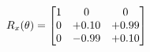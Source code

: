 \documentclass[preview]{standalone}
\begin{document}
\begin{align*}
\special{dvisvgm:raw <g id='unique000'>}R_{x}(\theta) = \begin{bmatrix}1 & 0 & 0 \\0 & +0.10 & +0.99 \\0 & -0.99 & +0.10\end{bmatrix}\special{dvisvgm:raw </g>}
\end{align*}
\end{document}
